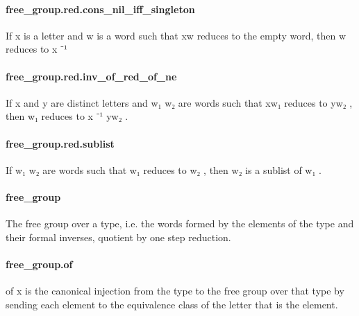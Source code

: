 \documentclass{article}
\begin{document}
\paragraph{free\_group.red.cons\_nil\_iff\_singleton}
\par
If 
\colorbox[RGB]{253,246,227}{{{{\color[RGB]{101, 123, 131} x }}}} is a letter and 
\colorbox[RGB]{253,246,227}{{{{\color[RGB]{101, 123, 131} w }}}} is a word such that 
\colorbox[RGB]{253,246,227}{{{{\color[RGB]{101, 123, 131} xw }}}} reduces to the empty word, then 
\colorbox[RGB]{253,246,227}{{{{\color[RGB]{101, 123, 131} w }}}} reduces
to 
\colorbox[RGB]{253,246,227}{{{{\color[RGB]{101, 123, 131} x }}}{{{\color[RGB]{181, 137, 0} ⁻¹ }}}}\paragraph{free\_group.red.inv\_of\_red\_of\_ne}
\par
If 
\colorbox[RGB]{253,246,227}{{{{\color[RGB]{101, 123, 131} x }}}} and 
\colorbox[RGB]{253,246,227}{{{{\color[RGB]{101, 123, 131} y }}}} are distinct letters and 
\colorbox[RGB]{253,246,227}{{{{\color[RGB]{101, 123, 131} w₁ w₂ }}}} are words such that 
\colorbox[RGB]{253,246,227}{{{{\color[RGB]{101, 123, 131} xw₁ }}}} reduces to 
\colorbox[RGB]{253,246,227}{{{{\color[RGB]{101, 123, 131} yw₂ }}}}, then
\colorbox[RGB]{253,246,227}{{{{\color[RGB]{101, 123, 131} w₁ }}}} reduces to 
\colorbox[RGB]{253,246,227}{{{{\color[RGB]{101, 123, 131} x }}}{{{\color[RGB]{181, 137, 0} ⁻¹ }}}{{{\color[RGB]{101, 123, 131} yw₂ }}}}.
\paragraph{free\_group.red.sublist}
\par
If 
\colorbox[RGB]{253,246,227}{{{{\color[RGB]{101, 123, 131} w₁ w₂ }}}} are words such that 
\colorbox[RGB]{253,246,227}{{{{\color[RGB]{101, 123, 131} w₁ }}}} reduces to 
\colorbox[RGB]{253,246,227}{{{{\color[RGB]{101, 123, 131} w₂ }}}}, then 
\colorbox[RGB]{253,246,227}{{{{\color[RGB]{101, 123, 131} w₂ }}}} is a sublist of 
\colorbox[RGB]{253,246,227}{{{{\color[RGB]{101, 123, 131} w₁ }}}}.
\paragraph{free\_group}
\par
The free group over a type, i.e. the words formed by the elements of the type and their formal
inverses, quotient by one step reduction.
\paragraph{free\_group.of}
\par
\colorbox[RGB]{253,246,227}{{{{\color[RGB]{101, 123, 131} of x }}}} is the canonical injection from the type to the free group over that type by sending each
element to the equivalence class of the letter that is the element.
\end{document}
